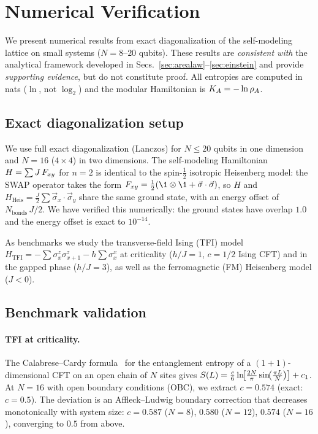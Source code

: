 \section{Numerical Verification}
\label{sec:numerical}

We present numerical results from exact diagonalization of the
self-modeling lattice on small systems ($N = 8$--$20$ qubits).  These
results are \emph{consistent with} the analytical framework developed
in Secs.~\ref{sec:arealaw}--\ref{sec:einstein} and provide
\emph{supporting evidence}, but do not constitute proof.  All
entropies are computed in nats ($\ln$, not $\log_2$) and the modular
Hamiltonian is $K_A = -\ln\rho_A$.

\subsection{Exact diagonalization setup}
\label{sec:ed-setup}

We use full exact diagonalization (Lanczos) for $N \leq 20$ qubits
in one dimension and $N = 16$ ($4 \times 4$) in two dimensions.  The
self-modeling Hamiltonian $H = \sum J\,F_{xy}$ for $n = 2$ is
identical to the spin-$\tfrac{1}{2}$ isotropic Heisenberg model: the
SWAP operator takes the form $\swapop = \frac{1}{2}(\1 \otimes \1 +
\vec{\sigma}\cdot\vec{\sigma})$, so $H$ and
$H_{\mathrm{Heis}} = \frac{J}{2}\sum
\vec{\sigma}_x \cdot \vec{\sigma}_y$ share the same ground state, with
an energy offset of $N_{\mathrm{bonds}}\, J/2$.  We have verified
this numerically: the ground states have overlap $1.0$ and the energy
offset is exact to $10^{-14}$.

As benchmarks we study the transverse-field Ising (TFI) model
$H_{\mathrm{TFI}} = -\sum \sigma^z_x \sigma^z_{x+1} - h\sum
\sigma^x_x$ at criticality ($h/J = 1$, $c = 1/2$ Ising CFT) and in
the gapped phase ($h/J = 3$), as well as the ferromagnetic (FM)
Heisenberg model ($J < 0$).

\subsection{Benchmark validation}
\label{sec:benchmarks}

\paragraph{TFI at criticality.}
The Calabrese--Cardy formula~\cite{CalabreseCardy2004} for the
entanglement entropy of a $(1{+}1)$-dimensional CFT on an open chain
of $N$ sites gives
$S(L) = \tfrac{c}{6}\ln\!\bigl[\tfrac{2N}{\pi}
\sin\!\bigl(\tfrac{\pi L}{N}\bigr)\bigr] + c_1$.
At $N = 16$ with open boundary conditions (OBC), we extract
$c = 0.574$ (exact: $c = 0.5$).  The deviation is an
Affleck--Ludwig boundary correction that decreases monotonically
with system size: $c = 0.587$ ($N = 8$), $0.580$ ($N = 12$),
$0.574$ ($N = 16$), converging to $0.5$ from above.

